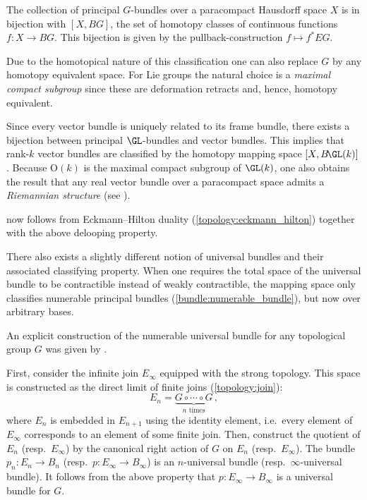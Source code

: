     \begin{property}[Classification]\label{bundle:classification}
        The collection of principal $G$-bundles over a paracompact Hausdorff space $X$ is in bijection with $[X,BG]$, the set of homotopy classes of continuous functions $f:X\rightarrow BG$. This bijection is given by the pullback-construction $f\mapsto f^*EG$.

        Due to the homotopical nature of this classification one can also replace $G$ by any homotopy equivalent space. For Lie groups the natural choice is a \textit{maximal compact subgroup} since these are deformation retracts and, hence, homotopy equivalent.
    \end{property}
    \begin{result}
        Since every vector bundle is uniquely related to its frame bundle, there exists a bijection between principal $\GL$-bundles and vector bundles. This implies that rank-$k$ vector bundles are classified by the homotopy mapping space $[X,B\!\GL(k)]$. Because $\mathrm{O}(k)$ is the maximal compact subgroup of $\GL(k)$, one also obtains the result that any real vector bundle over a paracompact space admits a \textit{Riemannian structure} (see ).

         now follows from Eckmann--Hilton duality (\cref{topology:eckmann_hilton}) together with the above delooping property.
    \end{result}
    \begin{remark}
        There also exists a slightly different notion of universal bundles and their associated classifying property. When one requires the total space of the universal bundle to be contractible instead of weakly contractible, the mapping space only classifies numerable principal bundles (\cref{bundle:numerable_bundle}), but now over arbitrary bases.
    \end{remark}

    An explicit construction of the numerable universal bundle for any topological group $G$ was given by .
    \begin{construct}
        First, consider the infinite join $E_\infty$ equipped with the strong topology. This space is constructed as the direct limit of finite joins (\cref{topology:join}): \[E_n=\underbrace{G\circ\cdots\circ G}_{n\text{ times}}\,,\] where $E_n$ is embedded in $E_{n+1}$ using the identity element, i.e.~every element of $E_\infty$ corresponds to an element of some finite join. Then, construct the quotient of $E_n$ (resp.~$E_\infty$) by the canonical right action of $G$ on $E_n$ (resp.~$E_\infty$). The bundle $p_n:E_n\rightarrow B_n$ (resp.~$p:E_\infty\rightarrow B_\infty$) is an $n$-universal bundle (resp.~$\infty$-universal bundle). It follows from the above property that $p:E_\infty\rightarrow B_\infty$ is a universal bundle for $G$.
    \end{construct}

